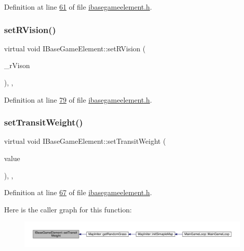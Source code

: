 Definition at line \hyperlink{a00047_source_l00061}{61} of file \hyperlink{a00047_source}{ibasegameelement.\+h}.

\mbox{\label{a00137_a2719e14051c30f39ca60f4998e48abf9}} 
\subsubsection{\texorpdfstring{set\+R\+Vision()}{setRVision()}}
{\footnotesize\ttfamily virtual void I\+Base\+Game\+Element\+::set\+R\+Vision (\begin{DoxyParamCaption}\item[{int}]{\+\_\+r\+Vison }\end{DoxyParamCaption})\hspace{0.3cm}{\ttfamily [inline]}, {\ttfamily [virtual]}, {\ttfamily [inherited]}}



Definition at line \hyperlink{a00047_source_l00079}{79} of file \hyperlink{a00047_source}{ibasegameelement.\+h}.

\mbox{\label{a00137_ac480b8140b5b290f49b4b96a47291180}} 
\subsubsection{\texorpdfstring{set\+Transit\+Weight()}{setTransitWeight()}}
{\footnotesize\ttfamily virtual void I\+Base\+Game\+Element\+::set\+Transit\+Weight (\begin{DoxyParamCaption}\item[{\hyperlink{a00161}{Infinity\+Double} $\ast$}]{value }\end{DoxyParamCaption})\hspace{0.3cm}{\ttfamily [inline]}, {\ttfamily [virtual]}, {\ttfamily [inherited]}}



Definition at line \hyperlink{a00047_source_l00067}{67} of file \hyperlink{a00047_source}{ibasegameelement.\+h}.

Here is the caller graph for this function\+:
\nopagebreak
\begin{figure}[H]
\begin{center}
\leavevmode
\includegraphics[width=350pt]{d2/df5/a00137_ac480b8140b5b290f49b4b96a47291180_icgraph}
\end{center}
\end{figure}
\mbox{\label{a00157_a455ad8853248e1976e9d817eb55f102a}} 
